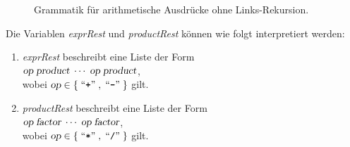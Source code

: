 \begin{figure}[htbp]
  \begin{center}    
  \end{center}
  \caption{Grammatik f\"ur arithmetische Ausdr\"ucke ohne Links-Rekursion.}
  \label{fig:Expr2}
\end{figure}

\noindent
Die Variablen \textsl{exprRest} und \textsl{productRest} k\"onnen wie folgt interpretiert werden:
\begin{enumerate}
\item \textsl{exprRest} beschreibt eine Liste der Form
      \\[0.2cm]
      \hspace*{1.3cm}
      $\textsl{op} \;\textsl{product} \;\cdots \;\textsl{op}\; \textsl{product}$,
      \\[0.2cm]
      wobei $\textsl{op} \in \{ \;\mbox{``\texttt{+}''}\;, \;\mbox{``\texttt{-}''}\; \}$ gilt.
\item \textsl{productRest} beschreibt eine Liste der Form
      \\[0.2cm]
      \hspace*{1.3cm}
      $\textsl{op} \;\textsl{factor} \;\cdots \;\textsl{op} \;\textsl{factor}$,
      \\[0.2cm]
      wobei $\textsl{op} \in \{ \;\mbox{``\texttt{*}''}\;, \;\mbox{``\texttt{/}''}\; \}$ gilt. 
\end{enumerate}


